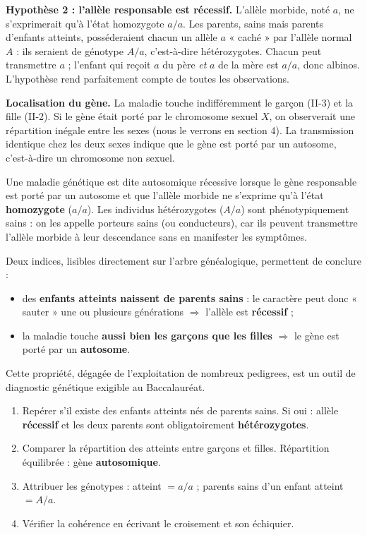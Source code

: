 \documentclass[11pt]{article}
\newcommand{\cle}[1]{{\popxbold\color{popdark}#1}}
\begin{document}
\textbf{Hypothèse 2 : l'allèle responsable est récessif.} L'allèle morbide, noté $a$, ne s'exprimerait qu'à l'état homozygote $a/a$. Les parents, sains mais parents d'enfants atteints, posséderaient chacun un allèle $a$ « caché » par l'allèle normal $A$ : ils seraient de génotype $A/a$, c'est-à-dire \cle{hétérozygotes}. Chacun peut transmettre $a$ ; l'enfant qui reçoit $a$ du père \emph{et} $a$ de la mère est $a/a$, donc albinos. L'hypothèse rend parfaitement compte de toutes les observations.

\textbf{Localisation du gène.} La maladie touche indifféremment le garçon (II-3) et la fille (II-2). Si le gène était porté par le chromosome sexuel $X$, on observerait une répartition inégale entre les sexes (nous le verrons en section 4). La transmission identique chez les deux sexes indique que le gène est porté par un \cle{autosome}, c'est-à-dire un chromosome non sexuel.

\begin{definition}
Une maladie génétique est dite \cle{autosomique récessive} lorsque le gène responsable est porté par un autosome et que l'allèle morbide ne s'exprime qu'à l'état \textbf{homozygote} ($a/a$). Les individus hétérozygotes ($A/a$) sont phénotypiquement sains : on les appelle \cle{porteurs sains} (ou conducteurs), car ils peuvent transmettre l'allèle morbide à leur descendance sans en manifester les symptômes.
\end{definition}

\begin{propriete}
Deux indices, lisibles directement sur l'arbre généalogique, permettent de conclure :
\begin{itemize}
\item des \textbf{enfants atteints naissent de parents sains} : le caractère peut donc « sauter » une ou plusieurs générations $\Rightarrow$ l'allèle est \textbf{récessif} ;
\item la maladie touche \textbf{aussi bien les garçons que les filles} $\Rightarrow$ le gène est porté par un \textbf{autosome}.
\end{itemize}
Cette propriété, dégagée de l'exploitation de nombreux pedigrees, est un outil de diagnostic génétique exigible au Baccalauréat.
\end{propriete}

\begin{methode}
\begin{enumerate}
\item Repérer s'il existe des enfants atteints nés de parents sains. Si oui : allèle \textbf{récessif} et les deux parents sont obligatoirement \textbf{hétérozygotes}.
\item Comparer la répartition des atteints entre garçons et filles. Répartition équilibrée : gène \textbf{autosomique}.
\item Attribuer les génotypes : atteint $= a/a$ ; parents sains d'un enfant atteint $= A/a$.
\item Vérifier la cohérence en écrivant le croisement et son échiquier.
\end{enumerate}
\end{methode}
\end{document}

